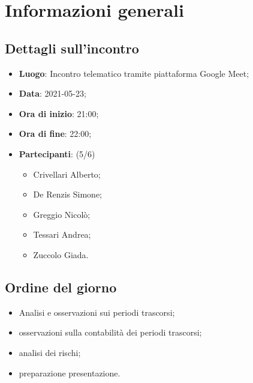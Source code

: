 \section{Informazioni generali}

\subsection{Dettagli sull'incontro}
\begin{itemize}
\item \textbf{Luogo}: Incontro telematico tramite piattaforma Google Meet;
\item \textbf{Data}: 2021-05-23;
\item \textbf{Ora di inizio}: 21:00;
\item \textbf{Ora di fine}: 22:00;
\item \textbf{Partecipanti}: (5/6) 
\begin{itemize}
	\item Crivellari Alberto;
	\item De Renzis Simone;
	\item Greggio Nicolò;
	\item Tessari Andrea;
	\item Zuccolo Giada.
\end{itemize}
\end{itemize}

\subsection{Ordine del giorno}
\begin{itemize}
	\item Analisi e osservazioni sui periodi trascorsi;
	\item osservazioni sulla contabilità dei periodi trascorsi;
	\item analisi dei rischi;
	\item preparazione presentazione.
\end{itemize}



